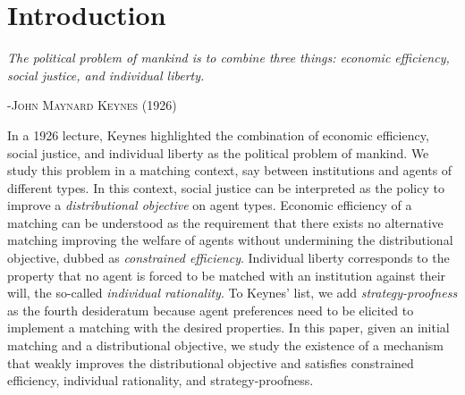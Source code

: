 \documentclass[12pt]{amsart}
\let\originalepigraph\epigraph
\renewcommand\epigraph[2]{\originalepigraph{\textit{#1}}{\textsc{#2}}}
\theoremstyle{remark}
\begin{document}
\section{Introduction}
\epigraph{\textit{The political problem of mankind is to combine three things: economic efficiency, social justice, and individual liberty.}}{-John Maynard Keynes (1926)}


In a 1926 lecture, Keynes highlighted the combination of economic efficiency, social justice, and individual liberty as the political problem of mankind.
We study this problem in a matching context, say between institutions and agents of different types. %
In this context, social justice can be interpreted as the policy to improve a \emph{distributional objective} on agent types. Economic efficiency of a matching can be understood as the requirement that there exists no alternative matching improving the welfare of agents without undermining the distributional objective, dubbed as \emph{constrained efficiency}. Individual liberty corresponds to the property that no agent is forced to be matched with an institution against their will, the so-called
\emph{individual rationality}. To Keynes' list, we add \emph{strategy-proofness} as the fourth desideratum because agent preferences need to be elicited to
implement a matching with the desired properties. In this paper, given an initial matching and a distributional objective, we study the existence of a mechanism
that weakly improves the distributional objective and satisfies constrained efficiency, individual rationality, and strategy-proofness.
\end{document}
